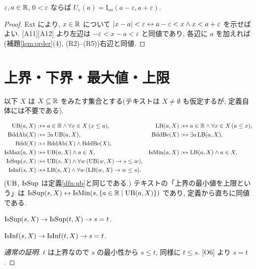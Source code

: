 \begin{prop}
  $\varepsilon, a \in \mathbb{R}$, $0 < \varepsilon$ ならば $U_\varepsilon(a) = \mathrm{I}_{oo}(a - \varepsilon, a + \varepsilon)$.
\end{prop}
\begin{proof}
  Ext により, $x \in \mathbb{R}$ について $\lvert x - a\rvert < \varepsilon \leftrightarrow a - \varepsilon < x \land x < a + \varepsilon$ を示せばよい. [A11][A12] より左辺は $-\varepsilon < x - a < \varepsilon$ と同値であり, 各辺に $a$ を加えれば(補題\ref{lem:order}(4), (R2)--(R5))右辺と同値.
\end{proof}

\section{上界・下界・最大値・上限}

以下 $X$ は $X \subseteq \mathbb{R}$ をみたす集合とする(テキストは $X \neq \emptyset$ も仮定するが, 定義自体には不要である).

\begin{dfn}[テキスト定義2.1--2.3]\label{dfn:bounds}
  \begin{align*}
    \mathrm{UB}(a, X) &:\leftrightarrow a \in \mathbb{R} \land \forall x \in X\,(x \leq a), &
    \mathrm{LB}(a, X) &:\leftrightarrow a \in \mathbb{R} \land \forall x \in X\,(a \leq x),\\
    \mathrm{BddAb}(X) &:\leftrightarrow \exists a\,\mathrm{UB}(a, X), &
    \mathrm{BddBe}(X) &:\leftrightarrow \exists a\,\mathrm{LB}(a, X),\\
    \mathrm{Bdd}(X) &:\leftrightarrow \mathrm{BddAb}(X) \land \mathrm{BddBe}(X), \\
    \mathrm{IsMax}(a, X) &:\leftrightarrow \mathrm{UB}(a, X) \land a \in X, &
    \mathrm{IsMin}(a, X) &:\leftrightarrow \mathrm{LB}(a, X) \land a \in X,\\
    \mathrm{IsSup}(s, X) &:\leftrightarrow \mathrm{UB}(s, X) \land \forall w\,(\mathrm{UB}(w, X) \to s \leq w), \\
    \mathrm{IsInf}(s, X) &:\leftrightarrow \mathrm{LB}(s, X) \land \forall w\,(\mathrm{LB}(w, X) \to w \leq s).
  \end{align*}
  ($\mathrm{UB}$, $\mathrm{IsSup}$ は定義\ref{dfn:ub}と同じである.) テキストの「上界の最小値を上限という」は $\mathrm{IsSup}(s,X) \leftrightarrow \mathrm{IsMin}(s, \{a \in \mathbb{R} \mid \mathrm{UB}(a,X)\})$ であり, 定義から直ちに同値である.
\end{dfn}

\begin{lem}[一意性]\label{lem:sup-unique}
  \begin{enumerate}[label={[B\arabic*]}, start=3]
    \item $\mathrm{IsSup}(s, X) \to \mathrm{IsSup}(t, X) \to s = t$.
    \item $\mathrm{IsInf}(s, X) \to \mathrm{IsInf}(t, X) \to s = t$.
  \end{enumerate}
\end{lem}
\begin{proof}[通常の証明]
  $t$ は上界なので $s$ の最小性から $s \leq t$, 同様に $t \leq s$. [O6] より $s = t$.
\end{proof}

